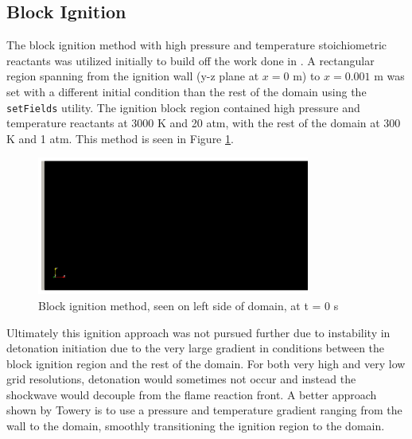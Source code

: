 \subsection{Block Ignition}

The block ignition method with high pressure and temperature stoichiometric reactants was utilized initially to build off the work done in \cite{towery1}. A rectangular region spanning from the ignition wall (y-z plane at \(x = 0\) m) to \(x = 0.001\) m was set with a different initial condition than the rest of the domain using the \verb|setFields| utility. The ignition block region contained high pressure and temperature reactants at 3000 K and 20 atm, with the rest of the domain at 300 K and 1 atm. This method is seen in Figure \ref{fig:blockig}.
\begin{figure}[h]
\centering
\includegraphics[width=0.8\textwidth]{figs/ignition/block.png}
\caption{Block ignition method, seen on left side of domain, at t = 0 s}
\label{fig:blockig}
\end{figure}%
\noindent Ultimately this ignition approach was not pursued further due to instability in detonation initiation due to the very large gradient in conditions between the block ignition region and the rest of the domain. For both very high and very low grid resolutions, detonation would sometimes not occur and instead the shockwave would decouple from the flame reaction front. A better approach shown by Towery\cite{towery2} is to use a pressure and temperature gradient ranging from the wall to the domain, smoothly transitioning the ignition region to the domain. 

